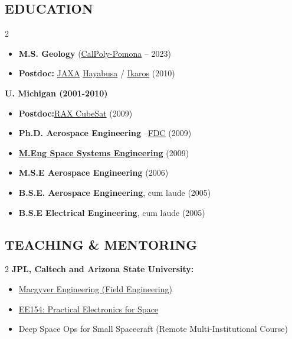 \documentclass[11pt,letterpaper]{article}
\begin{document}
\subsection*{EDUCATION}
\begin{multicols}{2}
\begin{itemize}
\item \textbf{M.S. Geology} (\href{https://www.cpp.edu/sci/geological-sciences/index.shtml}{CalPoly-Pomona} – 2023)
\item \textbf{Postdoc:} \href{https://www.isas.jaxa.jp/en/}{JAXA} \href{https://www.isas.jaxa.jp/en/missions/spacecraft/past/hayabusa.html}{Hayabusa} / \href{https://global.jaxa.jp/countdown/f17/overview/ikaros_e.html}{Ikaros} (2010)
\end{itemize}

\textbf{U. Michigan (2001-2010)}
\begin{itemize}
\item \textbf{Postdoc:}\href{https://en.wikipedia.org/wiki/Radio_Aurora_Explorer}{RAX CubeSat} (2009)
\item \textbf{Ph.D. Aerospace Engineering} –\href{https://aero.engin.umich.edu/}{FDC} (2009)
\item \textbf{\href{https://clasp.engin.umich.edu/academics/graduate-studies/masters-program/masters-space-engineering/}{M.Eng Space Systems Engineering}} (2009)
\item \textbf{M.S.E Aerospace Engineering} (2006)
\item \textbf{B.S.E. Aerospace Engineering}, cum laude (2005)
\item \textbf{B.S.E Electrical Engineering}, cum laude (2005)
\end{itemize}

\end{multicols}
\subsection*{TEACHING \& MENTORING}
\begin{multicols}{2}
\textbf{JPL, Caltech and Arizona State University:}

\begin{itemize}
\item \href{https://news.asu.edu/20201228-asu-students-channel-macgyver-solve-science-engineering-problems}{Macgyver Engineering (Field Engineering)}
\item \href{https://www.ee.caltech.edu/academics/courses/ee-154-ab}{EE154: Practical Electronics for Space}
\item Deep Space Ops for Small Spacecraft (Remote Multi-Institutional Course)
\end{itemize}

\end{multicols}
\end{document}
